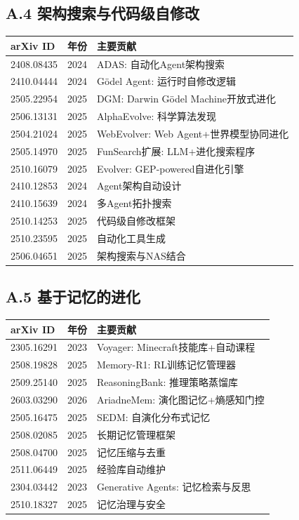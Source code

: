 \subsection*{A.4 架构搜索与代码级自修改}

\begin{longtable}{llp{7cm}}
\toprule
\textbf{arXiv ID} & \textbf{年份} & \textbf{主要贡献} \\
\midrule
2408.08435 & 2024 & ADAS: 自动化Agent架构搜索 \\
2410.04444 & 2024 & G\"{o}del Agent: 运行时自修改逻辑 \\
2505.22954 & 2025 & DGM: Darwin G\"{o}del Machine开放式进化 \\
2506.13131 & 2025 & AlphaEvolve: 科学算法发现 \\
2504.21024 & 2025 & WebEvolver: Web Agent+世界模型协同进化 \\
2505.14970 & 2025 & FunSearch扩展: LLM+进化搜索程序 \\
2510.16079 & 2025 & Evolver: GEP-powered自进化引擎 \\
2410.12853 & 2024 & Agent架构自动设计 \\
2410.15639 & 2024 & 多Agent拓扑搜索 \\
2510.14253 & 2025 & 代码级自修改框架 \\
2510.23595 & 2025 & 自动化工具生成 \\
2506.04651 & 2025 & 架构搜索与NAS结合 \\
\bottomrule
\end{longtable}

\subsection*{A.5 基于记忆的进化}

\begin{longtable}{llp{7cm}}
\toprule
\textbf{arXiv ID} & \textbf{年份} & \textbf{主要贡献} \\
\midrule
2305.16291 & 2023 & Voyager: Minecraft技能库+自动课程 \\
2508.19828 & 2025 & Memory-R1: RL训练记忆管理器 \\
2509.25140 & 2025 & ReasoningBank: 推理策略蒸馏库 \\
2603.03290 & 2026 & AriadneMem: 演化图记忆+熵感知门控 \\
2505.16475 & 2025 & SEDM: 自演化分布式记忆 \\
2508.02085 & 2025 & 长期记忆管理框架 \\
2508.04700 & 2025 & 记忆压缩与去重 \\
2511.06449 & 2025 & 经验库自动维护 \\
2304.03442 & 2023 & Generative Agents: 记忆检索与反思 \\
2510.18327 & 2025 & 记忆治理与安全 \\
\bottomrule
\end{longtable}

